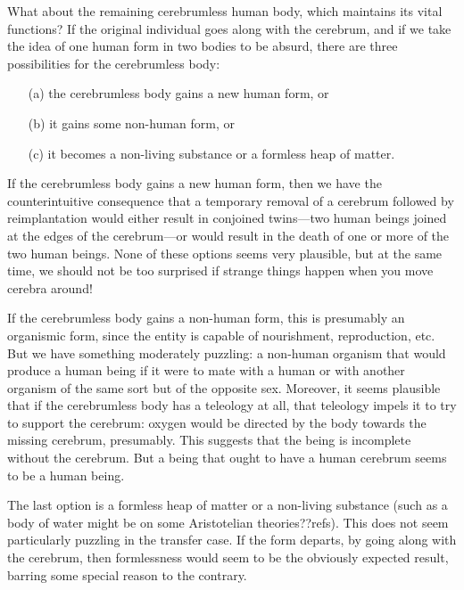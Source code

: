 What about the remaining cerebrumless human body, which maintains its vital functions? If the original individual goes along
with the cerebrum, and if we take the idea of one human form in two bodies to be absurd, there are three possibilities 
for the cerebrumless body:
\begin{itemize}
\item[(a)] the cerebrumless body gains a new human form, or 
\item[(b)] it gains some non-human form, or 
\item[(c)] it becomes a non-living substance or a formless heap of matter. 
\end{itemize}

If the cerebrumless body gains a new human form, then we have the counterintuitive consequence that a temporary removal
of a cerebrum followed by reimplantation would either result in conjoined twins---two human beings joined at the edges
of the cerebrum---or would result in the death of one or more of the two human beings. None of these options seems very
plausible, but at the same time, we should not be too surprised if strange things happen when you move cerebra around!

If the cerebrumless body gains a non-human form, this is presumably an organismic form, since the entity is capable of
nourishment, reproduction, etc. But we have something moderately puzzling: a non-human organism
that would produce a human being if it were to mate with a human or with another organism of the same sort but of the
opposite sex. Moreover, it seems plausible that if the cerebrumless body has a teleology at all, that teleology impels
it to try to support the cerebrum: oxygen would be directed by the body towards the missing cerebrum, presumably. This
suggests that the being is incomplete without the cerebrum. But a being that ought to have a human cerebrum seems to be 
a human being. 

The last option is a formless heap of matter or a non-living substance (such as a body of water might be on some 
Aristotelian theories??refs). This does not 
seem particularly puzzling in the transfer case. 
If the form departs, by going along with the cerebrum, then formlessness would seem to be the obviously expected result, 
barring some special reason to the contrary.

